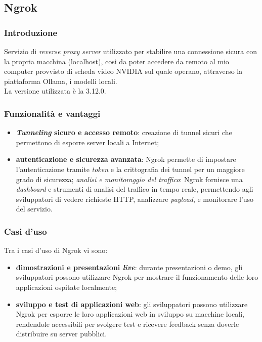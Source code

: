 \subsection{Ngrok}

\subsubsection{Introduzione}
Servizio di \textit{reverse proxy server} utilizzato per stabilire una connessione sicura con la propria macchina (localhost), così da poter accedere da remoto al mio computer provvisto di scheda video NVIDIA sul quale operano, attraverso la piattaforma Ollama, i modelli locali.\\
La versione utilizzata è la 3.12.0.

\subsubsection{Funzionalità e vantaggi}
\begin{itemize}
    \item \textbf{\textit{Tunneling} sicuro e accesso remoto}: creazione di tunnel sicuri che permettono di esporre server locali a Internet;
    \item \textbf{autenticazione e sicurezza avanzata}: Ngrok permette di impostare l’autenticazione tramite \textit{token} e la crittografia dei tunnel per un maggiore grado di sicurezza;
    \textit{analisi e monitoraggio del traffico}: Ngrok fornisce una \textit{dashboard} e strumenti di analisi del traffico in tempo reale, permettendo agli sviluppatori di vedere richieste HTTP, analizzare \textit{payload}, e monitorare l’uso del servizio.
\end{itemize}

\subsubsection{Casi d'uso}
Tra i casi d’uso di Ngrok vi sono:
\begin{itemize}
    \item \textbf{dimostrazioni e presentazioni \textit{live}}: durante presentazioni o demo, gli sviluppatori possono utilizzare Ngrok per mostrare il funzionamento delle loro applicazioni ospitate localmente;
    \item \textbf{sviluppo e test di applicazioni web}: gli sviluppatori possono utilizzare Ngrok per esporre le loro applicazioni web in sviluppo su macchine locali, rendendole accessibili per svolgere test e ricevere feedback senza doverle distribuire su server pubblici.
\end{itemize}


